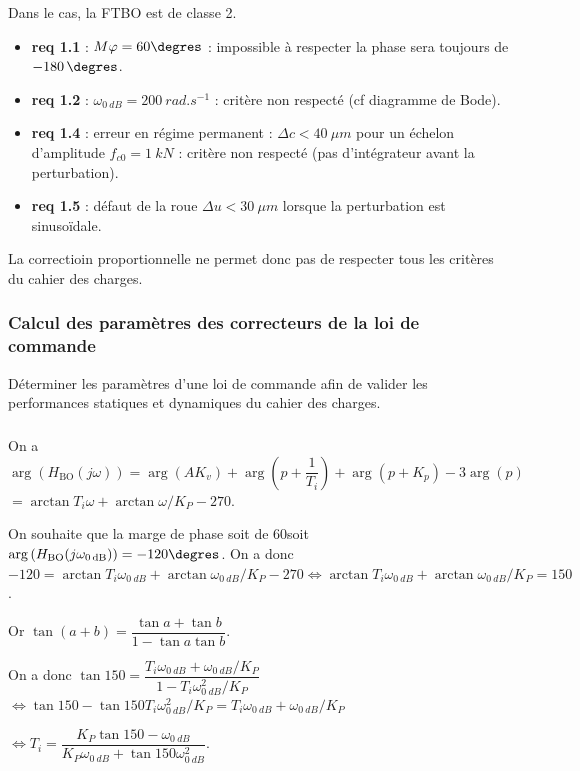 \documentclass[10pt,fleqn]{article} %
\begin{document}
Dans le cas, la FTBO est de classe 2.
\begin{itemize}
\item \textbf{req 1.1} : $M\varphi = 60\degres$ : impossible à respecter la phase sera toujours de $\SI{-180}{\degres}$.
\item \textbf{req 1.2} : $\omega_{\SI{0}{dB}}=\SI{200}{rad.s^{-1}}$ : critère non respecté (cf diagramme de Bode).
\item \textbf{req 1.4} : erreur en régime permanent : $\Delta c < \SI{40}{\mu m}$ pour un échelon d'amplitude $f_{c0}=\SI{1}{kN}$ : critère non respecté (pas d'intégrateur avant la perturbation).
\item \textbf{req 1.5} : défaut de la roue $\Delta u < \SI{30}{\mu m}$ lorsque la perturbation est sinusoïdale.
\end{itemize}

La correctioin proportionnelle ne permet donc pas de respecter tous les critères du cahier des charges.

\subsubsection{Calcul des paramètres des correcteurs de la loi de commande}

\begin{obj}
Déterminer les paramètres d’une loi de commande afin de valider les performances statiques et dynamiques du cahier des charges.
\end{obj}

\subparagraph{} %
On a $\arg \left(H_{\text{BO}}(j\omega)\right)=\arg\left(AK_v \right) + \arg\left(p+\dfrac{1}{T_i}\right) + \arg\left(p+K_p\right)-3 \arg(p)$
$ =\arctan T_i\omega +\arctan\omega/K_P -270$.

On souhaite que la marge de phase soit de 60\degres soit 
$\arg \left(H_{\text{BO}}(j\omega_{\SI{0}{dB}})\right)=-120\degres$. 
On a donc 
$-120=\arctan T_i\omega_{\SI{0}{dB}} +\arctan\omega_{\SI{0}{dB}}/K_P -270 \Leftrightarrow \arctan T_i\omega_{\SI{0}{dB}} +\arctan\omega_{\SI{0}{dB}}/K_P = 150$.

Or $\tan(a+b)=\dfrac{\tan a + \tan b}{1-\tan a\tan b}$. 

On a donc $\tan 150 = \dfrac{T_i\omega_{\SI{0}{dB}} + \omega_{\SI{0}{dB}}/K_P}{1-T_i\omega_{\SI{0}{dB}}^2/K_P}$
$ \Leftrightarrow \tan 150 -\tan 150 T_i\omega_{\SI{0}{dB}}^2/K_P= T_i\omega_{\SI{0}{dB}} + \omega_{\SI{0}{dB}}/K_P $

$ \Leftrightarrow  T_i  = \dfrac{K_P\tan 150 - \omega_{\SI{0}{dB}}}{K_P\omega_{\SI{0}{dB}}+\tan 150 \omega_{\SI{0}{dB}}^2}$.
\end{document}
